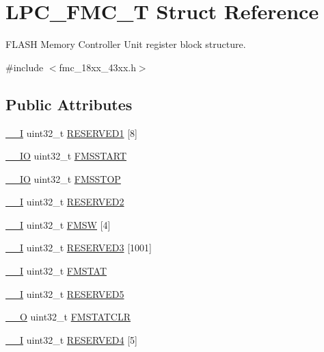 \hypertarget{struct_l_p_c___f_m_c___t}{}\section{L\+P\+C\+\_\+\+F\+M\+C\+\_\+T Struct Reference}
\label{struct_l_p_c___f_m_c___t}


F\+L\+A\+SH Memory Controller Unit register block structure.  




{\ttfamily \#include $<$fmc\+\_\+18xx\+\_\+43xx.\+h$>$}

\subsection*{Public Attributes}
\begin{DoxyCompactItemize}
\item 
\hyperlink{core__sc300_8h_af63697ed9952cc71e1225efe205f6cd3}{\+\_\+\+\_\+I} uint32\+\_\+t \hyperlink{struct_l_p_c___f_m_c___t_a17b10ffb216f33f76e0984f1bb97c3dd}{R\+E\+S\+E\+R\+V\+E\+D1} \mbox{[}8\mbox{]}
\item 
\hyperlink{core__sc300_8h_aec43007d9998a0a0e01faede4133d6be}{\+\_\+\+\_\+\+IO} uint32\+\_\+t \hyperlink{struct_l_p_c___f_m_c___t_a9b3295a45c90bcabe879ace3d0de0ef8}{F\+M\+S\+S\+T\+A\+RT}
\item 
\hyperlink{core__sc300_8h_aec43007d9998a0a0e01faede4133d6be}{\+\_\+\+\_\+\+IO} uint32\+\_\+t \hyperlink{struct_l_p_c___f_m_c___t_a3d484fa5da4d1e27addf19ad43b338ac}{F\+M\+S\+S\+T\+OP}
\item 
\hyperlink{core__sc300_8h_af63697ed9952cc71e1225efe205f6cd3}{\+\_\+\+\_\+I} uint32\+\_\+t \hyperlink{struct_l_p_c___f_m_c___t_a7178dad871ecfe95f8c6da27b96b25f5}{R\+E\+S\+E\+R\+V\+E\+D2}
\item 
\hyperlink{core__sc300_8h_af63697ed9952cc71e1225efe205f6cd3}{\+\_\+\+\_\+I} uint32\+\_\+t \hyperlink{struct_l_p_c___f_m_c___t_a00273f3f32e8eeff8dd8e384ef2c8199}{F\+M\+SW} \mbox{[}4\mbox{]}
\item 
\hyperlink{core__sc300_8h_af63697ed9952cc71e1225efe205f6cd3}{\+\_\+\+\_\+I} uint32\+\_\+t \hyperlink{struct_l_p_c___f_m_c___t_a737de22efd73a7fc9d306fad33022fea}{R\+E\+S\+E\+R\+V\+E\+D3} \mbox{[}1001\mbox{]}
\item 
\hyperlink{core__sc300_8h_af63697ed9952cc71e1225efe205f6cd3}{\+\_\+\+\_\+I} uint32\+\_\+t \hyperlink{struct_l_p_c___f_m_c___t_a0ecee36dd102cfd5d4eeb3113fbf508a}{F\+M\+S\+T\+AT}
\item 
\hyperlink{core__sc300_8h_af63697ed9952cc71e1225efe205f6cd3}{\+\_\+\+\_\+I} uint32\+\_\+t \hyperlink{struct_l_p_c___f_m_c___t_a374b0f7e9083f242ad88ed5e83202636}{R\+E\+S\+E\+R\+V\+E\+D5}
\item 
\hyperlink{core__sc300_8h_a7e25d9380f9ef903923964322e71f2f6}{\+\_\+\+\_\+O} uint32\+\_\+t \hyperlink{struct_l_p_c___f_m_c___t_a5cb3139486ee475934461686aa247ef5}{F\+M\+S\+T\+A\+T\+C\+LR}
\item 
\hyperlink{core__sc300_8h_af63697ed9952cc71e1225efe205f6cd3}{\+\_\+\+\_\+I} uint32\+\_\+t \hyperlink{struct_l_p_c___f_m_c___t_a3de36814c17bc936aed595fc2ea41010}{R\+E\+S\+E\+R\+V\+E\+D4} \mbox{[}5\mbox{]}
\end{DoxyCompactItemize}


